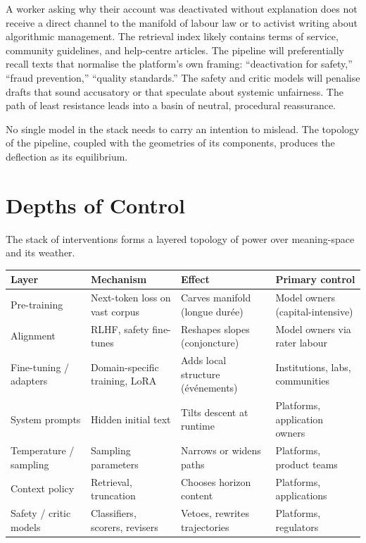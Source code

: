 \documentclass[12pt,a4paper]{article}
\begin{document}
A worker asking why their account was deactivated without explanation does not receive a direct channel to the manifold of labour law or to activist writing about algorithmic management. The retrieval index likely contains terms of service, community guidelines, and help-centre articles. The pipeline will preferentially recall texts that normalise the platform's own framing: ``deactivation for safety,'' ``fraud prevention,'' ``quality standards.'' The safety and critic models will penalise drafts that sound accusatory or that speculate about systemic unfairness. The path of least resistance leads into a basin of neutral, procedural reassurance.

No single model in the stack needs to carry an intention to mislead. The topology of the pipeline, coupled with the geometries of its components, produces the deflection as its equilibrium.

\section{Depths of Control}

The stack of interventions forms a layered topology of power over meaning-space and its weather.

\begin{formalbox}[title={Depths of intervention in meaning-space}]
\begin{tabular}{@{}llll@{}}
\toprule
\textbf{Layer} & \textbf{Mechanism} & \textbf{Effect} & \textbf{Primary control} \\
\midrule
Pre-training & Next-token loss on vast corpus & Carves manifold (longue durée) & Model owners (capital-intensive) \\
Alignment & RLHF, safety fine-tunes & Reshapes slopes (conjoncture) & Model owners via rater labour \\
Fine-tuning / adapters & Domain-specific training, LoRA & Adds local structure (événements) & Institutions, labs, communities \\
System prompts & Hidden initial text & Tilts descent at runtime & Platforms, application owners \\
Temperature / sampling & Sampling parameters & Narrows or widens paths & Platforms, product teams \\
Context policy & Retrieval, truncation & Chooses horizon content & Platforms, applications \\
Safety / critic models & Classifiers, scorers, revisers & Vetoes, rewrites trajectories & Platforms, regulators \\
\bottomrule
\end{tabular}
\end{formalbox}
\end{document}
